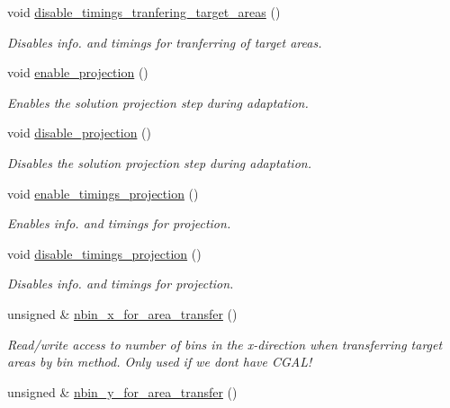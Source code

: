 \begin{DoxyCompactItemize}
void \hyperlink{classoomph_1_1RefineableTriangleMesh_ac40e14bcf3cabbf69bbe7df5896a2c5f}{disable\+\_\+timings\+\_\+tranfering\+\_\+target\+\_\+areas} ()
\begin{DoxyCompactList}\small\item\em Disables info. and timings for tranferring of target areas. \end{DoxyCompactList}\item 
void \hyperlink{classoomph_1_1RefineableTriangleMesh_a9cbf49d194c39396c7a6765b1c4520fc}{enable\+\_\+projection} ()
\begin{DoxyCompactList}\small\item\em Enables the solution projection step during adaptation. \end{DoxyCompactList}\item 
void \hyperlink{classoomph_1_1RefineableTriangleMesh_a6498186dd8e741789fd34f615b785c84}{disable\+\_\+projection} ()
\begin{DoxyCompactList}\small\item\em Disables the solution projection step during adaptation. \end{DoxyCompactList}\item 
void \hyperlink{classoomph_1_1RefineableTriangleMesh_a3228cb1170b25ce7f24fb520b1df184d}{enable\+\_\+timings\+\_\+projection} ()
\begin{DoxyCompactList}\small\item\em Enables info. and timings for projection. \end{DoxyCompactList}\item 
void \hyperlink{classoomph_1_1RefineableTriangleMesh_a44307109bc432cee8c16bb9d1c921d9e}{disable\+\_\+timings\+\_\+projection} ()
\begin{DoxyCompactList}\small\item\em Disables info. and timings for projection. \end{DoxyCompactList}\item 
unsigned \& \hyperlink{classoomph_1_1RefineableTriangleMesh_a6c52f0bc155980b2c36fb867ce9ec2d7}{nbin\+\_\+x\+\_\+for\+\_\+area\+\_\+transfer} ()
\begin{DoxyCompactList}\small\item\em Read/write access to number of bins in the x-\/direction when transferring target areas by bin method. Only used if we don\textquotesingle{}t have C\+G\+A\+L! \end{DoxyCompactList}\item 
unsigned \& \hyperlink{classoomph_1_1RefineableTriangleMesh_a063dc0162d4e352cbbcbbf72b1171f97}{nbin\+\_\+y\+\_\+for\+\_\+area\+\_\+transfer} ()

\end{DoxyCompactItemize}
